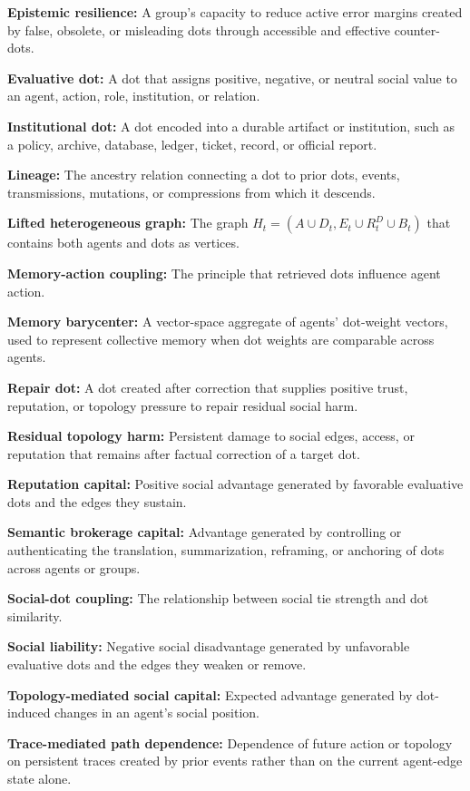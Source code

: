 \documentclass[11pt]{article}
\theoremstyle{remark}
\begin{document}
\textbf{Epistemic resilience:} A group's capacity to reduce active error margins created by false, obsolete, or misleading dots through accessible and effective counter-dots.

\textbf{Evaluative dot:} A dot that assigns positive, negative, or neutral social value to an agent, action, role, institution, or relation.

\textbf{Institutional dot:} A dot encoded into a durable artifact or institution, such as a policy, archive, database, ledger, ticket, record, or official report.

\textbf{Lineage:} The ancestry relation connecting a dot to prior dots, events, transmissions, mutations, or compressions from which it descends.

\textbf{Lifted heterogeneous graph:} The graph $H_t=(A\cup D_t,E_t\cup R_t^D\cup B_t)$ that contains both agents and dots as vertices.

\textbf{Memory-action coupling:} The principle that retrieved dots influence agent action.

\textbf{Memory barycenter:} A vector-space aggregate of agents' dot-weight vectors, used to represent collective memory when dot weights are comparable across agents.

\textbf{Repair dot:} A dot created after correction that supplies positive trust, reputation, or topology pressure to repair residual social harm.

\textbf{Residual topology harm:} Persistent damage to social edges, access, or reputation that remains after factual correction of a target dot.

\textbf{Reputation capital:} Positive social advantage generated by favorable evaluative dots and the edges they sustain.

\textbf{Semantic brokerage capital:} Advantage generated by controlling or authenticating the translation, summarization, reframing, or anchoring of dots across agents or groups.

\textbf{Social-dot coupling:} The relationship between social tie strength and dot similarity.

\textbf{Social liability:} Negative social disadvantage generated by unfavorable evaluative dots and the edges they weaken or remove.

\textbf{Topology-mediated social capital:} Expected advantage generated by dot-induced changes in an agent's social position.

\textbf{Trace-mediated path dependence:} Dependence of future action or topology on persistent traces created by prior events rather than on the current agent-edge state alone.

\clearpage
{}
{}


\end{document}
